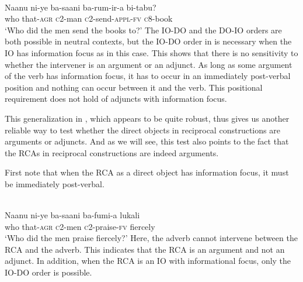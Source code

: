 \documentclass[output=paper]{langsci/langscibook}
\begin{document}
\ea\label{ex:safir:17} 
\settowidth{}
\\
\gll   Naanu    ni-ye    ba-saani   ba-rum-ir-a     bi-tabu?\\
     who     that-\textsc{agr}   \textsc{c}2-man   \textsc{c}2-send-\textsc{appl-fv}   \textsc{c}8-book\\
\glt ‘Who did the men send the books to?’
\z
\z
{}
The IO-DO and the DO-IO orders are both possible in neutral contexts, but the IO-DO order in  is necessary when the IO has information focus as in this case. This shows that there is no sensitivity to whether the intervener is an argument or an adjunct. As long as some argument of the verb has information focus, it has to occur in an immediately post-verbal position and nothing can occur between it and the verb. This positional requirement does not hold of adjuncts with information focus.

This generalization in , which appears to be quite robust, thus gives us another reliable way to test whether the direct objects in reciprocal constructions are arguments or adjuncts. And as we will see, this test also points to the fact that the RCAs in  reciprocal constructions are indeed  arguments.

First note that when the RCA as a direct object has information focus, it must be immediately post-verbal. 


\ea\label{ex:safir:18}
\settowidth{}
\\
\gll Naanu  ni-ye     ba-saani   ba-fumi-a   lukali\\
who   that-\textsc{agr}  \textsc{c}2-men   \textsc{c}2-praise-\textsc{fv}   fiercely\\
\glt ‘Who did the men praise fiercely?’
\z
\z
{}
Here, the adverb cannot intervene between the RCA and the adverb. This indicates that the RCA is an argument and not an adjunct. In addition, when the RCA is an IO with informational focus, only the IO-DO order is possible.
\end{document}
